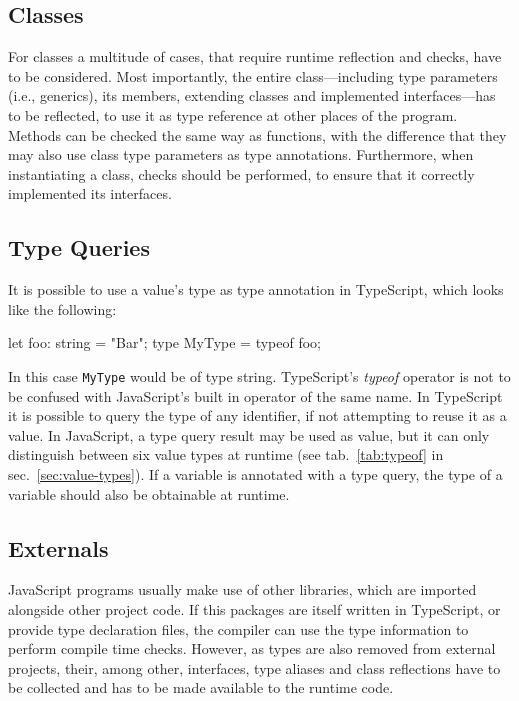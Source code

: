 \subsection{Classes}

For classes a multitude of cases, that require runtime reflection and checks, have to be considered. Most importantly, the entire class---including type parameters (i.e., generics), its members, extending classes and implemented interfaces---has to be reflected, to use it as type reference at other places of the program. Methods can be checked the same way as functions, with the difference that they may also use class type parameters as type annotations. Furthermore, when instantiating a class, checks should be performed, to ensure that it correctly implemented its interfaces.


\subsection{Type Queries}

It is possible to use a value's type as type annotation in TypeScript, which looks like the following:
\begin{JsCode}[numbers=none]
let foo: string = "Bar";
type MyType = typeof foo;
\end{JsCode}
In this case \texttt{MyType} would be of type string. TypeScript's \emph{typeof} operator is not to be confused with JavaScript's built in operator of the same name. In TypeScript it is possible to query the type of any identifier, if not attempting to reuse it as a value. In JavaScript, a type query result may be used as value, but it can only distinguish between six value types at runtime (see tab.~\ref{tab:typeof} in sec.~\ref{sec:value-types}). If a variable is annotated with a type query, the type of a variable should also be obtainable at runtime.

\subsection{Externals}

JavaScript programs usually make use of other libraries, which are imported alongside 
other project code. If this packages are itself written in TypeScript, or provide type declaration files, the compiler can use the type information to perform compile time checks. However, as types are also removed from external projects, their, among other, interfaces, type aliases and class reflections have to be collected and has to be made available to the runtime code.

